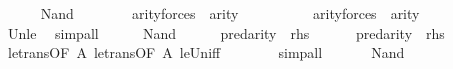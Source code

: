 \begin{isabellebody}
\ \ \ \ \isamarkupfalse%
\ Nand\isanewline
\ \ \ \ \isamarkupfalse%
\ {\isachardoublequoteopen}{}\ {\isasymunion}\ arity{\isacharparenleft}{\kern0pt}forces{\isacharprime}{\kern0pt}{\isacharparenleft}{\kern0pt}{\isasymphi}{\isacharparenright}{\kern0pt}{\isacharparenright}{\kern0pt}\ {\isasymle}\ arity{\isacharparenleft}{\kern0pt}{\isasymphi}{\isacharparenright}{\kern0pt}\ {\isacharhash}{\kern0pt}{\isacharplus}{\kern0pt}\ {}{\isachardoublequoteclose}\isanewline
\ \ \ \ \ \ {\isachardoublequoteopen}{}\ {\isasymunion}\ arity{\isacharparenleft}{\kern0pt}forces{\isacharprime}{\kern0pt}{\isacharparenleft}{\kern0pt}{\isasympsi}{\isacharparenright}{\kern0pt}{\isacharparenright}{\kern0pt}\ {\isasymle}\ arity{\isacharparenleft}{\kern0pt}{\isasympsi}{\isacharparenright}{\kern0pt}\ {\isacharhash}{\kern0pt}{\isacharplus}{\kern0pt}\ {}{\isachardoublequoteclose}\isanewline
\ \ \ \ \ \ \isamarkupfalse%
\ Un{\isacharunderscore}{\kern0pt}le\ \isamarkupfalse%
\ simp{\isacharunderscore}{\kern0pt}all\isanewline
\ \ \ \ \isamarkupfalse%
\ Nand\isanewline
\ \ \ \ \isamarkupfalse%
\ {\isachardoublequoteopen}pred{\isacharparenleft}{\kern0pt}arity{\isacharparenleft}{\kern0pt}{\isacharquery}{\kern0pt}{\isasymphi}{\isacharprime}{\kern0pt}{\isacharparenright}{\kern0pt}{\isacharparenright}{\kern0pt}\ {\isasymle}\ {\isacharquery}{\kern0pt}rhs{\isachardoublequoteclose}\isanewline
\ \ \ \ \ \ {\isachardoublequoteopen}pred{\isacharparenleft}{\kern0pt}arity{\isacharparenleft}{\kern0pt}{\isacharquery}{\kern0pt}{\isasympsi}{\isacharprime}{\kern0pt}{\isacharparenright}{\kern0pt}{\isacharparenright}{\kern0pt}\ {\isasymle}\ {\isacharquery}{\kern0pt}rhs{\isachardoublequoteclose}\isanewline
\ \ \ \ \ \ \isamarkupfalse%
\ le{\isacharunderscore}{\kern0pt}trans{\isacharbrackleft}{\kern0pt}OF\ A{\isacharparenleft}{\kern0pt}{}{\isacharparenright}{\kern0pt}{\isacharbrackright}{\kern0pt}\ le{\isacharunderscore}{\kern0pt}trans{\isacharbrackleft}{\kern0pt}OF\ A{\isacharparenleft}{\kern0pt}{}{\isacharparenright}{\kern0pt}{\isacharbrackright}{\kern0pt}\ le{\isacharunderscore}{\kern0pt}Un{\isacharunderscore}{\kern0pt}iff\isanewline
\ \ \ \ \ \ \isamarkupfalse%
\ simp{\isacharunderscore}{\kern0pt}all\isanewline
\ \ \isamarkupfalse%
\isanewline
\ \ \isamarkupfalse%
\ Nand\ {\isacartoucheopen}{\isacharunderscore}{\kern0pt}{\isacharequal}{\kern0pt}{}{\isacartoucheclose}\isanewline

\end{isabellebody}
